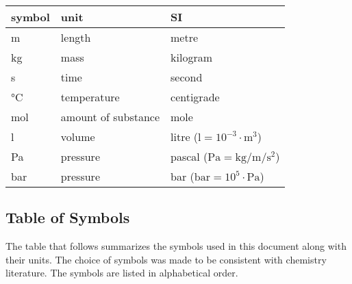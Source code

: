 \documentclass[12pt]{article}
\begin{document}
\renewcommand{\arraystretch}{1.2}
  \noindent \begin{tabular}{l l l} 
    \toprule		
    \textbf{symbol} & \textbf{unit} & \textbf{SI}\\
    \midrule 
    \si{\metre} & length & metre\\
    \si{\kilogram} & mass & kilogram\\
    \si{\second} & time & second\\
    \si{\celsius} & temperature & centigrade\\
    \si{\mole} & amount of substance & mole\\
    \si{\litre} & volume & litre 
      ($\si{\litre} = 10^{-3}\cdot\si{\cubic\metre}$)\\
    \si{\pascal} & pressure & pascal 
      ($\si{\pascal} = \si{\kilogram\per\metre\per\square\second}$)\\
    \si{\bar} & pressure & bar ($\si{\bar} = 10^{5}\cdot\si{\pascal}$)\\
    \bottomrule
  \end{tabular}

\subsection{Table of Symbols}

The table that follows summarizes the symbols used in this document along with
their units.  The choice of symbols was made to be consistent with chemistry 
literature.  The symbols are listed in alphabetical order.
\end{document}
